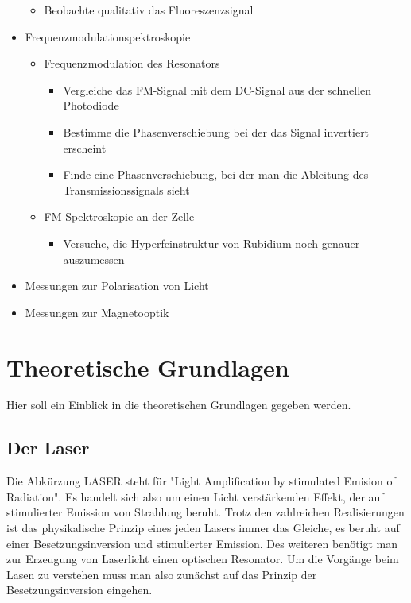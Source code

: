 \documentclass[12pt]{article}
\begin{document}
\begin{itemize}
\begin{itemize}
   \item Beobachte qualitativ das Fluoreszenzsignal
  \end{itemize}
 \item Frequenzmodulationspektroskopie
  \begin{itemize}
   \item Frequenzmodulation des Resonators
  \begin{itemize}
   \item Vergleiche das FM-Signal mit dem DC-Signal aus der schnellen Photodiode
   \item Bestimme die Phasenverschiebung bei der das Signal invertiert erscheint
   \item Finde eine Phasenverschiebung, bei der man die Ableitung des Transmissionssignals sieht
  \end{itemize}
   \item FM-Spektroskopie an der Zelle
  \begin{itemize}
   \item Versuche, die Hyperfeinstruktur von Rubidium noch genauer auszumessen
  \end{itemize}
  \end{itemize}
  \item Messungen zur Polarisation von Licht
  \item Messungen zur Magnetooptik
\end{itemize}
\newpage

\section{Theoretische Grundlagen}
Hier soll ein Einblick in die theoretischen Grundlagen gegeben werden.
\subsection{Der Laser}
Die Abkürzung LASER steht für "Light Amplification by stimulated Emision of Radiation". Es handelt sich also um einen Licht verstärkenden Effekt, der auf stimulierter Emission von Strahlung beruht. Trotz den zahlreichen Realisierungen ist das physikalische Prinzip eines jeden Lasers immer das Gleiche, es beruht auf einer Besetzungsinversion und stimulierter Emission. Des weiteren benötigt man zur Erzeugung von Laserlicht einen optischen Resonator. Um die Vorgänge beim Lasen zu verstehen muss man also zunächst auf das Prinzip der Besetzungsinversion eingehen.
\end{document}
